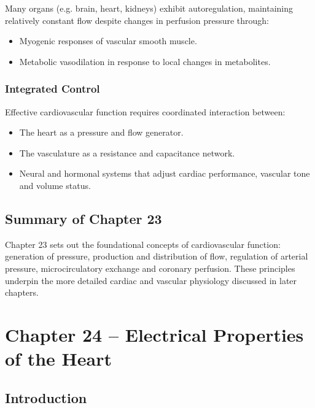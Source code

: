 \documentclass[11pt,a4paper]{article}
\begin{document}
Many organs (e.g. brain, heart, kidneys) exhibit autoregulation, maintaining relatively constant flow despite changes in perfusion pressure through:
\begin{itemize}
  \item Myogenic responses of vascular smooth muscle.
  \item Metabolic vasodilation in response to local changes in metabolites.
\end{itemize}

\subsubsection{Integrated Control}

Effective cardiovascular function requires coordinated interaction between:
\begin{itemize}
  \item The heart as a pressure and flow generator.
  \item The vasculature as a resistance and capacitance network.
  \item Neural and hormonal systems that adjust cardiac performance, vascular tone and volume status.
\end{itemize}

\subsection{Summary of Chapter 23}

Chapter 23 sets out the foundational concepts of cardiovascular function: generation of pressure, production and distribution of flow, regulation of arterial pressure, microcirculatory exchange and coronary perfusion. These principles underpin the more detailed cardiac and vascular physiology discussed in later chapters.


\section{Chapter 24 – Electrical Properties of the Heart}

\subsection{Introduction}
\end{document}
